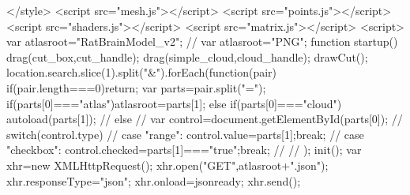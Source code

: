         </style>
        <script src="mesh.js"></script>
        <script src="points.js"></script>
        <script src="shaders.js"></script>
        <script src="matrix.js"></script>
        <script>
            var atlasroot="RatBrainModel_v2";
  //          var atlasroot="PNG";
            function startup(){
                drag(cut_box,cut_handle);
                drag(simple_cloud,cloud_handle);
                drawCut();
                location.search.slice(1).split("&").forEach(function(pair){
                    if(pair.length===0)return;
                    var parts=pair.split("=");
                    if(parts[0]==="atlas")atlasroot=parts[1];
                    else if(parts[0]==="cloud"){
                        autoload(parts[1]);
                    }
//                    else{
//                        var control=document.getElementById(parts[0]);
//                        switch(control.type){
//                            case "range": control.value=parts[1];break;
//                            case "checkbox": control.checked=parts[1]==="true";break;
//                        }
//                    }
                });
                init();
                var xhr=new XMLHttpRequest();
                xhr.open("GET",atlasroot+".json");
                xhr.responseType="json";
                xhr.onload=jsonready;
                xhr.send();
            }
            
